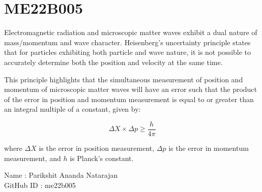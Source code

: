 \section{ME22B005}

Electromagnetic radiation and microscopic matter waves exhibit a dual nature of mass/momentum and wave character. Heisenberg's uncertainty principle states that for particles exhibiting both particle and wave nature, it is not possible to accurately determine both the position and velocity at the same time.

This principle highlights that the simultaneous measurement of position and momentum of microscopic matter waves will have an error such that the product of the error in position and momentum measurement is equal to or greater than an integral multiple of a constant, given by:

\begin{equation}
\Delta X \times \Delta p \ge \frac{h}{4\pi}
\end{equation}

where $\Delta X$ is the error in position measurement, $\Delta p$ is the error in momentum measurement, and $h$ is Planck's constant.

Name : Parikshit Ananda Natarajan \\
GitHub ID : me22b005 \\
